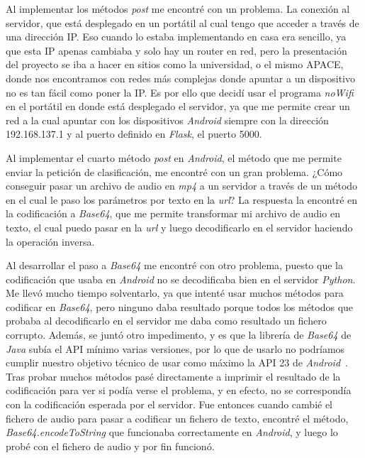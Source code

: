 Al implementar los métodos \textit{post} me encontré con un problema. La conexión al servidor, que está desplegado en un portátil al cual tengo que acceder a través de una dirección IP. Eso cuando lo estaba implementando en casa era sencillo, ya que esta IP apenas cambiaba y solo hay un router en red, pero la presentación del proyecto se iba a hacer en sitios como la universidad, o el mismo APACE, donde nos encontramos con redes más complejas donde apuntar a un dispositivo no es tan fácil como poner la IP. Es por ello que decidí usar el programa \textit{noWifi} en el portátil en donde está desplegado el servidor, ya que me permite crear un red a la cual apuntar con los dispositivos \textit{Android} siempre con la dirección 192.168.137.1 y al puerto definido en \textit{Flask}, el puerto 5000.

Al implementar el cuarto método \textit{post} en \textit{Android}, el método que me permite enviar la petición de clasificación, me encontré con un gran problema. ¿Cómo conseguir pasar un archivo de audio en \textit{mp4} a un servidor a través de un método en el cual le paso los parámetros por texto en la \textit{url}? La respuesta la encontré en la codificación a \textit{Base64}, que me permite transformar mi archivo de audio en texto, el cual puedo pasar en la \textit{url} y luego decodificarlo en el servidor haciendo la operación inversa. 

Al desarrollar el paso a \textit{Base64} me encontré con otro problema, puesto que la codificación que usaba en \textit{Android} no se decodificaba bien en el servidor \textit{Python}. Me llevó mucho tiempo solventarlo, ya que intenté usar muchos métodos para codificar en \textit{Base64}, pero ninguno daba resultado porque todos los métodos que probaba al decodificarlo en el servidor me daba como resultado un fichero corrupto. Además, se juntó otro impedimento, y es que la librería de \textit{Base64} de \textit{Java} subía el API mínimo varias versiones, por lo que de usarlo no podríamos cumplir nuestro objetivo técnico de usar como máximo la API 23 de \textit{Android}~\cite{base64java}. Tras probar muchos métodos pasé directamente a imprimir el resultado de la codificación para ver si podía verse el problema, y en efecto, no se correspondía con la codificación esperada por el servidor. Fue entonces cuando cambié el fichero de audio para pasar a codificar un fichero de texto, encontré el método, \textit{Base64.encodeToString} que funcionaba correctamente en \textit{Android}, y luego lo probé con el fichero de audio y por fin funcionó.

